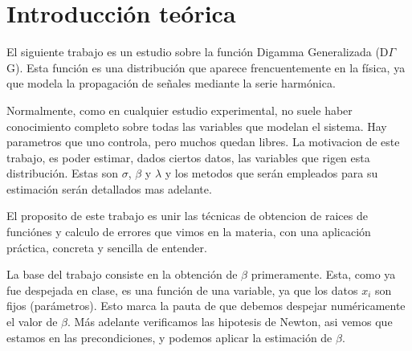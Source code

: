 \section{Introducci\'on teórica}

El siguiente trabajo es un estudio sobre la funci\'on Digamma Generalizada (D$\Gamma$G). Esta funci\'on es una
distribuci\'on que aparece frencuentemente en la f\'isica, ya que modela la propagaci\'on de se\~nales mediante la
serie harm\'onica.

Normalmente, como en cualquier estudio experimental, no suele haber conocimiento completo sobre todas las variables
que modelan el sistema. Hay parametros que uno controla, pero muchos quedan libres. La motivacion de este trabajo,
es poder estimar, dados ciertos datos, las variables que rigen esta distribuci\'on. Estas son $\sigma$, $\beta$ y $\lambda$
y los metodos que ser\'an empleados para su estimaci\'on ser\'an detallados mas adelante.

El proposito de este trabajo es unir las t\'ecnicas de obtencion de raices de funci\'ones y calculo de errores
que vimos en la materia, con una aplicaci\'on pr\'actica, concreta y sencilla de entender.

La base del trabajo consiste en la obtenci\'on de $\beta$ primeramente. Esta, como ya fue despejada en clase, es una funci\'on
de una variable, ya que los datos $x_i$ son fijos (par\'ametros). Esto marca la pauta de que debemos despejar num\'ericamente el
valor de $\beta$. M\'as adelante verificamos las hipotesis de Newton, asi vemos que estamos en las precondiciones,
y podemos aplicar la estimaci\'on de $\beta$.

